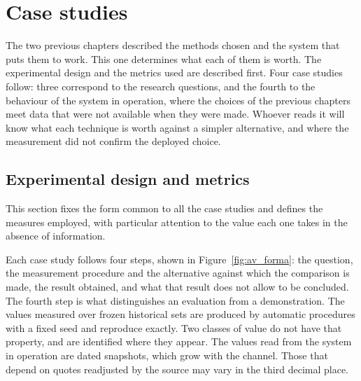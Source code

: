 \chapter{Case studies}
\label{cap:avaliacao}

The two previous chapters described the methods chosen and the system that puts them to work. This
one determines what each of them is worth. The experimental design and the metrics used are
described first. Four case studies follow: three correspond to the research questions, and the
fourth to the behaviour of the system in operation, where the choices of the previous chapters meet
data that were not available when they were made. Whoever reads it will know what each technique is worth against a simpler alternative, and where the measurement did not confirm the deployed choice.

\section{Experimental design and metrics}
\label{sec:av_desenho}

This section fixes the form common to all the case studies and defines the measures employed, with
particular attention to the value each one takes in the absence of information.

Each case study follows four steps, shown in Figure~\ref{fig:av_forma}: the question, the
measurement procedure and the alternative against which the comparison is made, the result
obtained, and what that result does not allow to be concluded. The fourth step is what distinguishes
an evaluation from a demonstration. The values measured over frozen historical sets are produced by
automatic procedures with a fixed seed and reproduce exactly. Two classes of value do not have that
property, and are identified where they appear. The values read from the system in operation are
dated snapshots, which grow with the channel. Those that depend on quotes readjusted by the source
may vary in the third decimal place.


